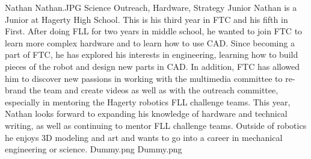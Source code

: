 \insertbio
{Nathan}
{Nathan.JPG}
{Science}
{Outreach, Hardware, Strategy}
{Junior}
{
Nathan is a Junior at Hagerty High School. This is his third year in FTC and his fifth in First. After doing FLL for two years in middle school, he wanted to join FTC to learn more complex hardware and to learn how to use CAD. Since becoming a part of FTC, he has explored his interests in engineering, learning how to build pieces of the robot and design new parts in CAD. In addition, FTC has allowed him to discover new passions in working with the multimedia committee to re-brand the team and create videos as well as with the outreach committee, especially in mentoring the Hagerty robotics FLL challenge teams. This year, Nathan looks forward to expanding his knowledge of hardware and technical writing, as well as continuing to mentor FLL challenge teams. Outside of robotics he enjoys 3D modeling and art and wants to go into a career in mechanical engineering or science.
}
{Dummy.png}
{Dummy.png}
